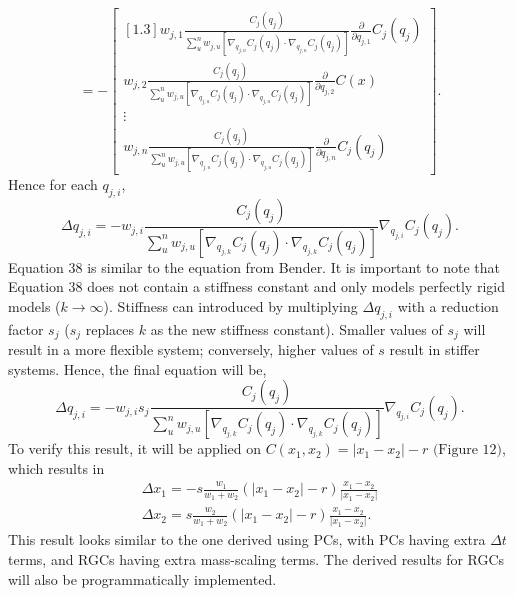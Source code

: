 \documentclass[12pt, letterpaper]{article}
\begin{document}
$$=-\begin{bmatrix}[1.3]w_{j,1}\frac{C_j(q_j)}{\sum\limits_{u}^{n} w_{j,u}[\nabla_{q_{j,u}} C_j(q_j) \cdot \nabla_{q_{j,u}} C_j(q_j)]} \frac{\partial}{\partial q_{j,1}} C_j(q_j)  \\ w_{j,2} \frac{C_j(q_j)} {\sum\limits_{u}^{n} w_{j,u} [\nabla_{q_{j,u}} C_j(q_j) \cdot \nabla_{q_{j,u}} C_j(q_j)]} \frac{\partial}{\partial q_{j,2}}C(x)\\ \vdots\\w_{j,n}\frac{C_j(q_j)}{\sum\limits_{u}^{n} w_{j,u}[\nabla_{q_{j,u}} C_j(q_j) \cdot \nabla_{q_{j,u}} C_j(q_j)]} \frac{\partial}{\partial q_{j,n}}C_j(q_j)\end{bmatrix}.$$
Hence for each $q_{j,i}$,
\begin{equation}
   \Delta q_{j,i} = -w_{j,i} \frac{C_j(q_j)}{\sum\limits^{n}_{u} w_{j,u}[ \nabla_{q_{j,k}}C_j(q_j) \cdot \nabla_{q_{j,k}}C_j(q_j)]}\nabla_{q_{j,i}}C_j(q_j).
\end{equation}
Equation 38 is similar to the equation from Bender. It is important to note that Equation 38 does not contain a stiffness constant and only models perfectly rigid models ($k \rightarrow \infty$). Stiffness can introduced by multiplying $\Delta q_{j,i}$ with a reduction factor $s_j$ ($s_j$ replaces $k$ as the new stiffness constant). Smaller values of $s_j$ will result in a more flexible system; conversely, higher values of $s$ result in stiffer systems. Hence, the final equation will be,
\begin{equation}
   \Delta q_{j,i} = -w_{j,i} s_j \frac{C_j(q_j)}{\sum\limits^{n}_{u} w_{j,u}[ \nabla_{q_{j,k}}C_j(q_j) \cdot \nabla_{q_{j,k}}C_j(q_j)]}\nabla_{q_{j,i}}C_j(q_j).
\end{equation}
To verify this result, it will be applied on $C(x_{1},x_{2}) = |x_{1}-x_{2}|-r$ $\text{(Figure 12)}$, which results in 
\begin{equation}
    \begin{gathered}
        \Delta x_{1} = -s\frac{w_{1}}{w_{1}+w_{2}}(|x_{1} - x_{2}|-r) \frac{x_{1} - x_{2}}{|x_{1} - x_{2}|}\\
        \Delta x_{2} = s\frac{w_{2}}{w_{1}+w_{2}}(|x_{1} - x_{2}|-r) \frac{x_{1} - x_{2}}{|x_{1} - x_{2}|}.
    \end{gathered}
\end{equation}
This result looks similar to the one derived using PCs, with PCs having extra $\Delta t$ terms, and RGCs having extra mass-scaling terms. The derived results for RGCs will also be programmatically implemented. 
\end{document}
